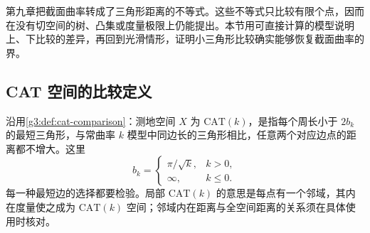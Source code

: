 
% 
% 
% 


第九章把截面曲率转成了三角形距离的不等式。这些不等式只比较有限个点，因而在没有切空间的树、凸集或度量极限上仍能提出。本节用可直接计算的模型说明上、下比较的差异，再回到光滑情形，证明小三角形比较确实能够恢复截面曲率的界。

\subsection{CAT 空间的比较定义}
\label{g3:subsec:1005:01}
沿用\cref{g3:def:cat-comparison}：测地空间 \(X\) 为 \(\mathrm{CAT}(k)\)，是指每个周长小于 \(2b_k\) 的最短三角形，与常曲率 \(k\) 模型中同边长的三角形相比，任意两个对应边点的距离都不增大。这里
\[
	b_k=\begin{cases}\pi/\sqrt{k},&k>0,\\\infty,&k\le0.\end{cases}
\]
每一种最短边的选择都要检验。局部 \(\mathrm{CAT}(k)\) 的意思是每点有一个邻域，其内在度量使之成为 \(\mathrm{CAT}(k)\) 空间；邻域内在距离与全空间距离的关系须在具体使用时核对。

